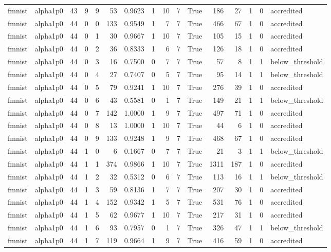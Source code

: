 \begin{tabular}{llrrrrrrrrrrrrrl}
fmnist & alpha1p0 & 43 & 9 & 9 & 53 & 0.9623 & 1 & 10 & 7 & True & 186 & 27 & 1 & 0 & accredited \\
fmnist & alpha1p0 & 44 & 0 & 0 & 133 & 0.9549 & 1 & 7 & 7 & True & 466 & 67 & 1 & 0 & accredited \\
fmnist & alpha1p0 & 44 & 0 & 1 & 30 & 0.9667 & 1 & 10 & 7 & True & 105 & 15 & 1 & 0 & accredited \\
fmnist & alpha1p0 & 44 & 0 & 2 & 36 & 0.8333 & 1 & 6 & 7 & True & 126 & 18 & 1 & 0 & accredited \\
fmnist & alpha1p0 & 44 & 0 & 3 & 16 & 0.7500 & 0 & 7 & 7 & True & 57 & 8 & 1 & 1 & below\_threshold \\
fmnist & alpha1p0 & 44 & 0 & 4 & 27 & 0.7407 & 0 & 5 & 7 & True & 95 & 14 & 1 & 1 & below\_threshold \\
fmnist & alpha1p0 & 44 & 0 & 5 & 79 & 0.9241 & 1 & 10 & 7 & True & 276 & 39 & 1 & 0 & accredited \\
fmnist & alpha1p0 & 44 & 0 & 6 & 43 & 0.5581 & 0 & 1 & 7 & True & 149 & 21 & 1 & 1 & below\_threshold \\
fmnist & alpha1p0 & 44 & 0 & 7 & 142 & 1.0000 & 1 & 9 & 7 & True & 497 & 71 & 1 & 0 & accredited \\
fmnist & alpha1p0 & 44 & 0 & 8 & 13 & 1.0000 & 1 & 10 & 7 & True & 44 & 6 & 1 & 0 & accredited \\
fmnist & alpha1p0 & 44 & 0 & 9 & 133 & 0.9248 & 1 & 9 & 7 & True & 468 & 67 & 1 & 0 & accredited \\
fmnist & alpha1p0 & 44 & 1 & 0 & 6 & 0.1667 & 0 & 7 & 7 & True & 21 & 3 & 1 & 1 & below\_threshold \\
fmnist & alpha1p0 & 44 & 1 & 1 & 374 & 0.9866 & 1 & 10 & 7 & True & 1311 & 187 & 1 & 0 & accredited \\
fmnist & alpha1p0 & 44 & 1 & 2 & 32 & 0.5312 & 0 & 6 & 7 & True & 113 & 16 & 1 & 1 & below\_threshold \\
fmnist & alpha1p0 & 44 & 1 & 3 & 59 & 0.8136 & 1 & 7 & 7 & True & 207 & 30 & 1 & 0 & accredited \\
fmnist & alpha1p0 & 44 & 1 & 4 & 152 & 0.9342 & 1 & 5 & 7 & True & 531 & 76 & 1 & 0 & accredited \\
fmnist & alpha1p0 & 44 & 1 & 5 & 62 & 0.9677 & 1 & 10 & 7 & True & 217 & 31 & 1 & 0 & accredited \\
fmnist & alpha1p0 & 44 & 1 & 6 & 93 & 0.7957 & 0 & 1 & 7 & True & 326 & 47 & 1 & 1 & below\_threshold \\
fmnist & alpha1p0 & 44 & 1 & 7 & 119 & 0.9664 & 1 & 9 & 7 & True & 416 & 59 & 1 & 0 & accredited \\

\end{tabular}
